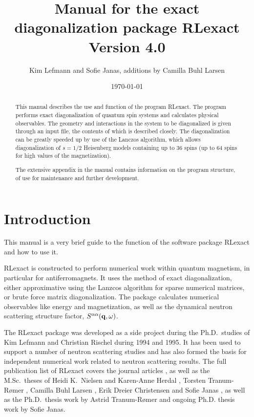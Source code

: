 \documentclass{article}
\begin{document}
\title{Manual for the exact diagonalization package RLexact \\
Version 4.0}
\author{Kim Lefmann and Sofie Janas, additions by Camilla Buhl Larsen}
\date{\today}
\maketitle
\begin{abstract}
This manual describes the use and function of the program RLexact. The program performs exact diagonalization of quantum spin systems and calculates physical observables. The geometry and interactions in the system to be diagonalized is given through an input file, the contents of which is described closely. The diagonalization can be greatly speeded up by use of the Lanczos algorithm,
which allows diagonalization of $s=1/2$ Heisenberg models containing up to 36 spins (up to 64 spins for high values of the magnetization). 

The extensive appendix in the manual contains information on the program structure, of use for maintenance and further development.
\end{abstract}

\newpage

\tableofcontents

\newpage

\section{Introduction}
This manual is a very brief guide to the function of the software package RLexact and how to use it. 

RLexact \cite{lefmann96} is constructed to perform numerical work within quantum magnetism, in particular for antiferromagnets. It uses the method
of exact diagonalization, either approximative using the Lanzcos algorithm for sparse numerical matrices, or brute force matrix diagonalization. The package calculates numerical observables like energy and magnetization, 
as well as the dynamical neutron scattering structure factor, $S^{\alpha \alpha}({\bf q},\omega)$.

The RLexact package was developed as a side project during the Ph.D.\ studies of Kim Lefmann and Christian Rischel during 1994 and 1995.
It has been used to support a number of neutron scattering studies and has also formed the basis for independent numerical work
related to neutron scattering results. The full publication list of RLexact covers the journal articles \cite{lefmann96,rischel98,lefmann00, lefmann01,juntunen01,ronnow01,ronnow02,zhang02,stone03,fogh15,ring}, as well as the M.Sc.\ theses of Heidi K.\ Nielsen and Karen-Anne Herdal \cite{HKA}, Torsten Tranum-R\o mer \cite{TTR}, Camilla Buhl Larsen \cite{CBL}, Erik Dreier Christensen \cite{EDC} and Sofie Janas \cite{SJ}, as well as the Ph.D.\ thesis work by Astrid Tranum-R\o mer and ongoing Ph.D. thesis work by Sofie Janas.
\end{document}

